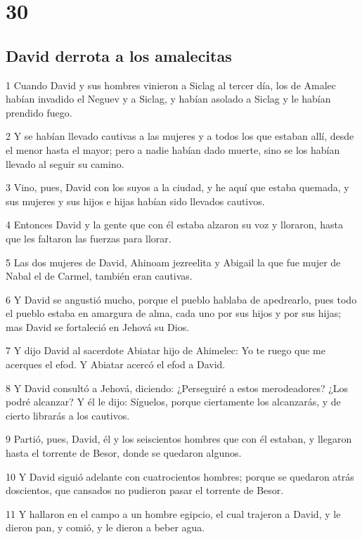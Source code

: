 \chapter{30}

\section*{David derrota a los amalecitas}

\par 1 Cuando David y sus hombres vinieron a Siclag al tercer día, los de Amalec habían invadido el Neguev y a Siclag, y habían asolado a Siclag y le habían prendido fuego.
\par 2 Y se habían llevado cautivas a las mujeres y a todos los que estaban allí, desde el menor hasta el mayor; pero a nadie habían dado muerte, sino se los habían llevado al seguir su camino.
\par 3 Vino, pues, David con los suyos a la ciudad, y he aquí que estaba quemada, y sus mujeres y sus hijos e hijas habían sido llevados cautivos.
\par 4 Entonces David y la gente que con él estaba alzaron su voz y lloraron, hasta que les faltaron las fuerzas para llorar.
\par 5 Las dos mujeres de David, Ahinoam jezreelita y Abigail la que fue mujer de Nabal el de Carmel, también eran cautivas. 
\par 6 Y David se angustió mucho, porque el pueblo hablaba de apedrearlo, pues todo el pueblo estaba en amargura de alma, cada uno por sus hijos y por sus hijas; mas David se fortaleció en Jehová su Dios.
\par 7 Y dijo David al sacerdote Abiatar hijo de Ahimelec: Yo te ruego que me acerques el efod. Y Abiatar acercó el efod a David.
\par 8 Y David consultó a Jehová, diciendo: ¿Perseguiré a estos merodeadores? ¿Los podré alcanzar? Y él le dijo: Síguelos, porque ciertamente los alcanzarás, y de cierto librarás a los cautivos.
\par 9 Partió, pues, David, él y los seiscientos hombres que con él estaban, y llegaron hasta el torrente de Besor, donde se quedaron algunos.
\par 10 Y David siguió adelante con cuatrocientos hombres; porque se quedaron atrás doscientos, que cansados no pudieron pasar el torrente de Besor.
\par 11 Y hallaron en el campo a un hombre egipcio, el cual trajeron a David, y le dieron pan, y comió, y le dieron a beber agua.
